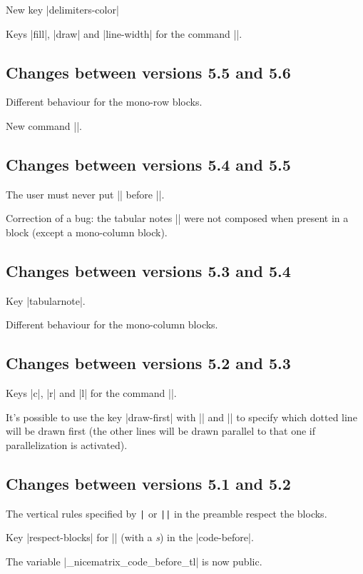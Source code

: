 \documentclass[dvipsnames]{article}%
\begin{document}
New key |delimiters-color|

Keys |fill|, |draw| and |line-width| for the command |\Block|.

\subsection*{Changes between versions 5.5 and 5.6}

Different behaviour for the mono-row blocks.

New command |\NotEmpty|.

\subsection*{Changes between versions 5.4 and 5.5}

The user must never put |\omit| before |\CodeAfter|.

Correction of a bug: the tabular notes |\tabularnotes| were not composed when
present in a block (except a mono-column block).

\subsection*{Changes between versions 5.3 and 5.4}

Key |tabularnote|.

Different behaviour for the mono-column blocks.

\subsection*{Changes between versions 5.2 and 5.3}

Keys |c|, |r| and |l| for the command |\Block|.

It's possible to use the key |draw-first| with |\Ddots| and |\Iddots| to
specify which dotted line will be drawn first (the other lines will be drawn
parallel to that one if parallelization is activated).

\subsection*{Changes between versions 5.1 and 5.2}

The vertical rules specified by \verb+|+ or \verb+||+ in the preamble respect
the blocks.

Key |respect-blocks| for |\rowcolors| (with a \emph{s}) in the |code-before|.

The variable |\g_nicematrix_code_before_tl| is now public.
\end{document}
